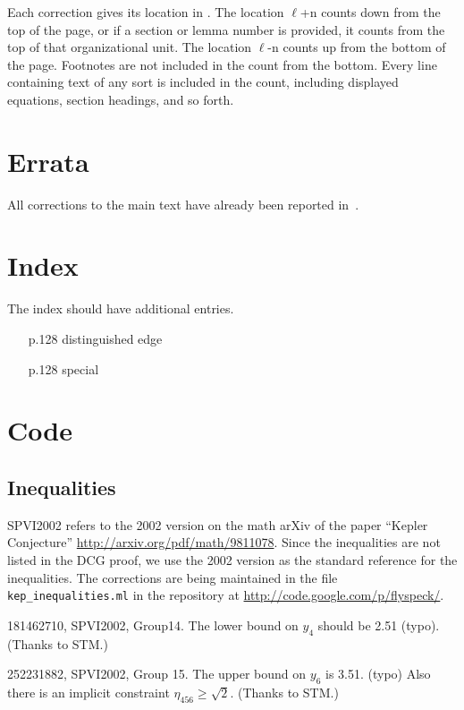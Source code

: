 \documentclass[11pt]{amsart}
\def\line{$\ell$}
\begin{document}
Each correction gives its location in \cite{DCG}.
The location
\line+n counts down from the top of the page, or
if a section or lemma number is provided, it
counts from the top of that organizational unit.
The location \line-n counts up from the bottom
of the page. Footnotes are not included in the
count from the bottom.  Every line containing
text of any sort is included in the count,
including displayed equations, section headings,
and so forth.


\section{Errata}

All corrections to the main text have already been reported
in~\cite{RKC}.


\section{Index}

The index should have additional entries.
\begin{itemize}
	\item [p.128] distinguished edge
	\item [p.128] special
\end{itemize}

\section{Code}

\subsection{Inequalities}  

SPVI2002 refers to the 2002 version on the math arXiv of the paper
``Kepler Conjecture''  \url{http://arxiv.org/pdf/math/9811078}.
Since the inequalities are not listed in the DCG proof, we use the 2002 version as the standard reference for the inequalities.  The corrections are being maintained in the file {\tt kep\_inequalities.ml} in the repository at \url{http://code.google.com/p/flyspeck/}.

\smallskip

181462710, SPVI2002, Group14.  The lower bound on $y_4$ should be 2.51 (typo).
(Thanks to STM.)

252231882, SPVI2002, Group 15.  The upper bound on $y_6$ is 3.51. (typo)
Also there is an implicit constraint $\eta_{456}\ge\sqrt2$.
(Thanks to STM.)
\end{document}
